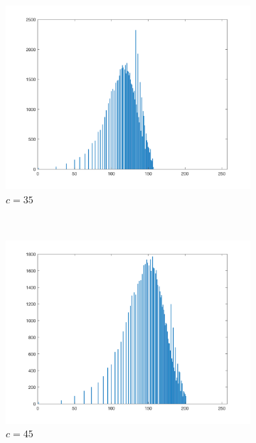 \documentclass{article}
\begin{document}
\begin{enumerate}[label=(\alph*)]
\begin{figure}[!htb]
        \begin{subfigure}[b]{0.3\textwidth}
            \includegraphics[width=\textwidth]{img/hist_LT35.png}
            \caption{$c = 35$}
        \end{subfigure}
        ~
        \begin{subfigure}[b]{0.3\textwidth}
            \includegraphics[width=\textwidth]{img/hist_LT45.png}
            \caption{$c = 45$}
        \end{subfigure}
        ~
        \begin{subfigure}[b]{0.3\textwidth}

\end{subfigure}
\end{figure}
\end{enumerate}
\end{document}
